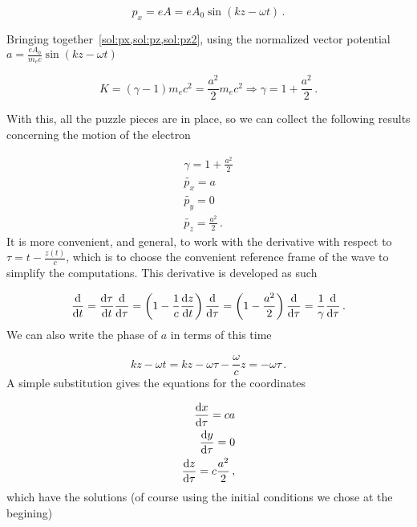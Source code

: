 \documentclass[12pt, class=report, crop=false]{standalone}
\begin{document}
\begin{equation}
  \label{sol:px}
  p_x = e A = e A_0 \sin(kz-\omega t)\,.
\end{equation}

Bringing together~\cref{sol:px,sol:pz,sol:pz2}, using the normalized vector potential \(a = \frac{e A_0}{m_e c} \sin(kz-\omega t)\)

\begin{equation}
  K = (\gamma -1)m_e c^2 =\frac{a^2}{2}m_e c^2 \Rightarrow \gamma = 1 + \frac{a^2}{2}\,.
\end{equation}

With this, all the puzzle pieces are in place, so we can collect the following results concerning the motion of the electron

\begin{subequations}
  \begin{align}
    \gamma = 1 + \frac{a^2}{2}\\
    \tilde{p_x} = a\\
    \tilde{p_y} = 0\\
    \tilde{p_z} = \frac{a^2}{2}\,.
  \end{align}
\end{subequations}
It is more convenient, and general, to work with the derivative with respect to \(\tau = t - \frac{z(t)}{c}\), which is to choose the convenient reference frame of the wave to simplify the computations. This derivative is developed as such

\begin{equation}
  \dv{t} = \dv{\tau}{t} \dv{\tau} = \left( 1 - \frac{1}{c} \dv{z}{t} \right) \dv{\tau} = \left( 1 - \frac{a^2}{2}  \right) \dv{\tau} = \frac{1}{\gamma} \dv{\tau}\,.
\end{equation}
We can also write the phase of \(a\) in terms of this time

\begin{equation}
  kz-\omega  t= kz -\omega\tau - \frac{\omega}{c} z = - \omega \tau\,.
\end{equation}
A simple substitution gives the equations for the coordinates

\begin{subequations}
  \begin{align}
    \dv{x}{\tau} = c a\\
    \dv{y}{\tau} = 0\\
    \dv{z}{\tau} = c \frac{a^2}{2}\,,
  \end{align}
\end{subequations}
which have the solutions (of course using the initial conditions we chose at the begining)
\end{document}
